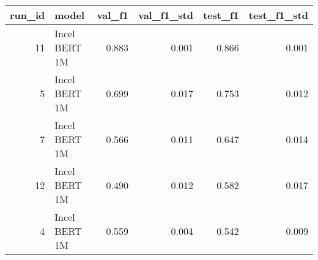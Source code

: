 \begin{tabular}{rlrrrr}
\toprule
 run\_id &         model &  val\_f1 &  val\_f1\_std &  test\_f1 &  test\_f1\_std \\
\midrule
     11 & Incel BERT 1M &   0.883 &       0.001 &    0.866 &        0.001 \\
      5 & Incel BERT 1M &   0.699 &       0.017 &    0.753 &        0.012 \\
      7 & Incel BERT 1M &   0.566 &       0.011 &    0.647 &        0.014 \\
     12 & Incel BERT 1M &   0.490 &       0.012 &    0.582 &        0.017 \\
      4 & Incel BERT 1M &   0.559 &       0.004 &    0.542 &        0.009 \\
\bottomrule
\end{tabular}
